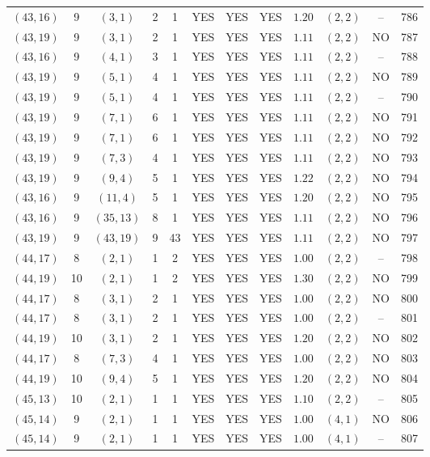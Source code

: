 \begin{longtable}{|c|c|c|c|c|c|c|c|c|c|c|c|}
$(43,16)$ & 9 & $(3,1)$ & 2 & 1 & YES & YES & YES & $1.20$ & $(2,2)$ & -- & 786\\
$(43,19)$ & 9 & $(3,1)$ & 2 & 1 & YES & YES & YES & $1.11$ & $(2,2)$ & NO & 787\\
$(43,16)$ & 9 & $(4,1)$ & 3 & 1 & YES & YES & YES & $1.11$ & $(2,2)$ & -- & 788\\
$(43,19)$ & 9 & $(5,1)$ & 4 & 1 & YES & YES & YES & $1.11$ & $(2,2)$ & NO & 789\\
$(43,19)$ & 9 & $(5,1)$ & 4 & 1 & YES & YES & YES & $1.11$ & $(2,2)$ & -- & 790\\
$(43,19)$ & 9 & $(7,1)$ & 6 & 1 & YES & YES & YES & $1.11$ & $(2,2)$ & NO & 791\\
$(43,19)$ & 9 & $(7,1)$ & 6 & 1 & YES & YES & YES & $1.11$ & $(2,2)$ & NO & 792\\
$(43,19)$ & 9 & $(7,3)$ & 4 & 1 & YES & YES & YES & $1.11$ & $(2,2)$ & NO & 793\\
$(43,19)$ & 9 & $(9,4)$ & 5 & 1 & YES & YES & YES & $1.22$ & $(2,2)$ & NO & 794\\
$(43,16)$ & 9 & $(11,4)$ & 5 & 1 & YES & YES & YES & $1.20$ & $(2,2)$ & NO & 795\\
$(43,16)$ & 9 & $(35,13)$ & 8 & 1 & YES & YES & YES & $1.11$ & $(2,2)$ & NO & 796\\
$(43,19)$ & 9 & $(43,19)$ & 9 & 43 & YES & YES & YES & $1.11$ & $(2,2)$ & NO & 797\\
$(44,17)$ & 8 & $(2,1)$ & 1 & 2 & YES & YES & YES & $1.00$ & $(2,2)$ & -- & 798\\
$(44,19)$ & 10 & $(2,1)$ & 1 & 2 & YES & YES & YES & $1.30$ & $(2,2)$ & NO & 799\\
$(44,17)$ & 8 & $(3,1)$ & 2 & 1 & YES & YES & YES & $1.00$ & $(2,2)$ & NO & 800\\
$(44,17)$ & 8 & $(3,1)$ & 2 & 1 & YES & YES & YES & $1.00$ & $(2,2)$ & -- & 801\\
$(44,19)$ & 10 & $(3,1)$ & 2 & 1 & YES & YES & YES & $1.20$ & $(2,2)$ & NO & 802\\
$(44,17)$ & 8 & $(7,3)$ & 4 & 1 & YES & YES & YES & $1.00$ & $(2,2)$ & NO & 803\\
$(44,19)$ & 10 & $(9,4)$ & 5 & 1 & YES & YES & YES & $1.20$ & $(2,2)$ & NO & 804\\
$(45,13)$ & 10 & $(2,1)$ & 1 & 1 & YES & YES & YES & $1.10$ & $(2,2)$ & -- & 805\\
$(45,14)$ & 9 & $(2,1)$ & 1 & 1 & YES & YES & YES & $1.00$ & $(4,1)$ & NO & 806\\
$(45,14)$ & 9 & $(2,1)$ & 1 & 1 & YES & YES & YES & $1.00$ & $(4,1)$ & -- & 807\\

\end{longtable}
